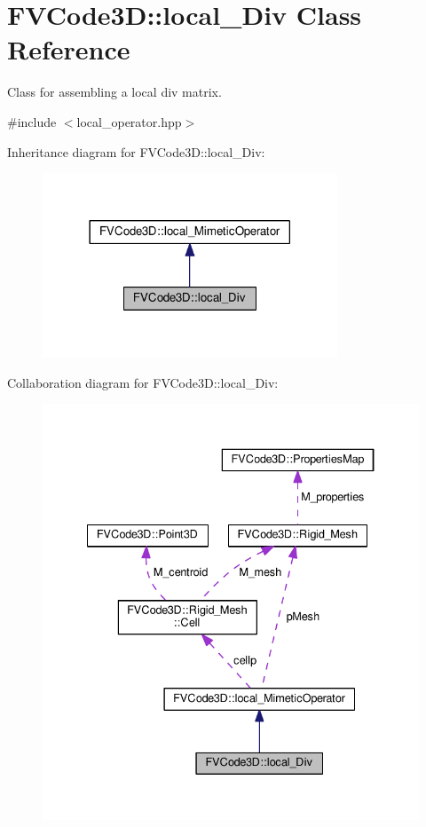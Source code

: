\hypertarget{classFVCode3D_1_1local__Div}{}\section{F\+V\+Code3D\+:\+:local\+\_\+\+Div Class Reference}
\label{classFVCode3D_1_1local__Div}


Class for assembling a local div matrix.  




{\ttfamily \#include $<$local\+\_\+operator.\+hpp$>$}



Inheritance diagram for F\+V\+Code3D\+:\+:local\+\_\+\+Div\+:
\nopagebreak
\begin{figure}[H]
\begin{center}
\leavevmode
\includegraphics[width=249pt]{classFVCode3D_1_1local__Div__inherit__graph}
\end{center}
\end{figure}


Collaboration diagram for F\+V\+Code3D\+:\+:local\+\_\+\+Div\+:
\nopagebreak
\begin{figure}[H]
\begin{center}
\leavevmode
\includegraphics[width=334pt]{classFVCode3D_1_1local__Div__coll__graph}
\end{center}
\end{figure}
